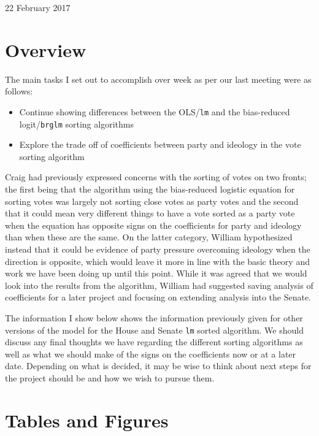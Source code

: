 \documentclass[12pt]{article}
\begin{document}
\begin{center}
\Large 22 February 2017
\end{center}

\section{Overview}

The main tasks I set out to accomplish over week as per our last meeting were as follows:

\begin{itemize}
	\item Continue showing differences between the OLS/\verb|lm| and the bias-reduced logit/\verb|brglm| sorting algorithms

	\item Explore the trade off of coefficients between party and ideology in the vote sorting algorithm
\end{itemize}

\noindent
Craig had previously expressed concerns with the sorting of votes on two fronts; the first being that the algorithm using the bias-reduced logistic equation for sorting votes was largely not sorting close votes as party votes and the second that it could mean very different things to have a vote sorted as a party vote when the equation has opposite signs on the coefficients for party and ideology than when these are the same. On the latter category, William hypothesized instead that it could be evidence of party pressure overcoming ideology when the direction is opposite, which would leave it more in line with the basic theory and work we have been doing up until this point. While it was agreed that we would look into the results from the algorithm, William had suggested saving analysis of coefficients for a later project and focusing on extending analysis into the Senate.

The information I show below shows the information previously given for other versions of the model for the House and Senate \verb|lm| sorted algorithm. We should discuss any final thoughts we have regarding the different sorting algorithms as well as what we should make of the signs on the coefficients now or at a later date. Depending on what is decided, it may be wise to think about next steps for the project should be and how we wish to pursue them.

\pagebreak

\section{Tables and Figures}
\end{document}
